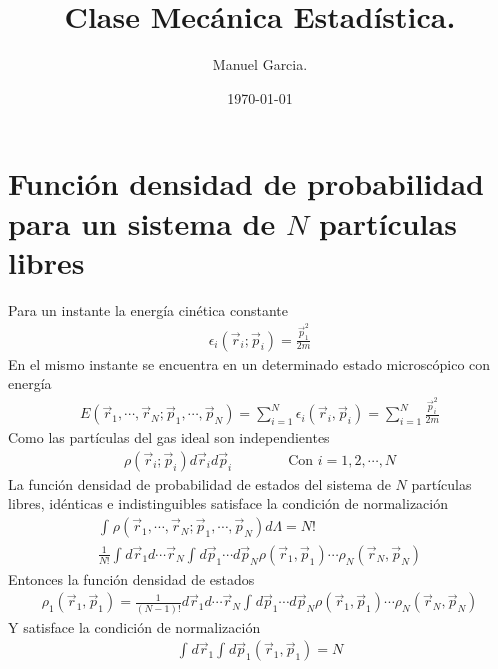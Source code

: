 \documentclass{article}
\title{Clase Mecánica Estadística.}
\author{Manuel Garcia.}
\date{\today}
\begin{document}
\maketitle

\section{Función densidad de probabilidad para un sistema de $ N  $ partículas libres } 

\hfill 

Para un instante la energía cinética constante 
\begin{gather*}
  \epsilon_i(\vec r_i; \vec p_i ) = \frac{\vec p_1^2 }{2m } 
\end{gather*}
En el mismo instante se encuentra en un determinado estado microscópico con energía 
\begin{gather*}
  E(\vec r_1,\cdots, \vec r_N; \vec p_1 , \cdots, \vec p_N) = \displaystyle\sum_{i=1 }^{N } \epsilon_i (\vec r_i, \vec p_i ) = \displaystyle\sum_{i=1 }^{ N }  \frac{\vec p_i ^2 }{2m } 
\end{gather*}
Como las partículas del gas ideal son independientes 
\begin{gather*}
  \rho (\vec r_i; \vec p_i ) d\vec r_i d\vec p_i \qquad \qquad \text{Con } i = 1,2,\cdots,N 
\end{gather*}
La función densidad de probabilidad de estados del sistema de $ N  $ partículas libres, idénticas e indistinguibles satisface la condición de normalización 
\begin{gather*}
  \displaystyle\int_{}^{} \rho (\vec r_1, \cdots , \vec r_N; \vec p_1, \cdots, \vec p_N ) d \Lambda = N!  \\
  \frac{1}{N! } \displaystyle\int_{}^{}d\vec r_1 d \cdots \vec r_N \displaystyle\int_{}^{}d\vec p_1 \cdots d\vec p_N \rho (\vec r_1, \vec p_1 ) \cdots \rho_N(\vec r_N, \vec p_N ) 
\end{gather*}
Entonces la función densidad de estados 
\begin{gather*}
  \rho_1(\vec r_1, \vec p_1 ) = \frac{1}{(N-1 )! } d\vec r_1 d \cdots \vec r_N \displaystyle\int_{}^{}d\vec p_1 \cdots d\vec p_N \rho (\vec r_1, \vec p_1 ) \cdots \rho_N(\vec r_N, \vec p_N ) 
\end{gather*}
Y satisface la condición de normalización 
\begin{gather*}
  \displaystyle\int_{}^{}d\vec r_1 \displaystyle\int_{}^{} d\vec p_1 (\vec r_1, \vec p_1 )  = N 
\end{gather*}
\end{document}

